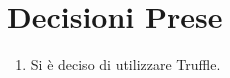 \section{Decisioni Prese}
\begin{enumerate}
  \item Si è deciso di utilizzare Truffle.
\end{enumerate}
